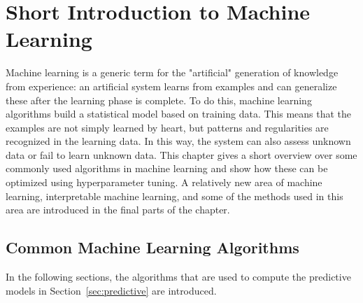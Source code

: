 %
\chapter{Short Introduction to Machine Learning}\label{ch:ml}
Machine learning is a generic term for the "artificial" generation of knowledge from experience: an artificial system learns from examples and can generalize these after the learning phase is complete. To do this, machine learning algorithms build a statistical model based on training data. This means that the examples are not simply learned by heart, but patterns and regularities are recognized in the learning data. In this way, the system can also assess unknown data or fail to learn unknown data. This chapter gives a short overview over some commonly used algorithms in machine learning and show how these can be optimized using hyperparameter tuning. A relatively new area of machine learning, interpretable machine learning, and some of the methods used in this area are introduced in the final parts of the chapter.
\section{Common Machine Learning Algorithms}\label{sec:algo}
In the following sections, the algorithms that are used to compute the predictive models in Section~\ref{sec:predictive} are introduced.
